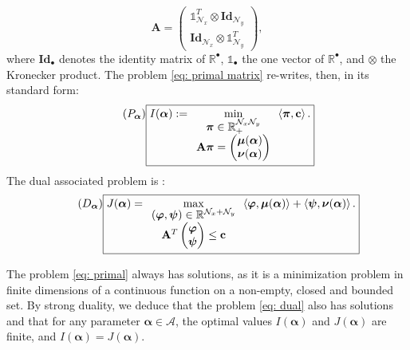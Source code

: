 \documentclass{article}
\def\RR{\mathbb{R}}
\def\cA{\mathcal{A}}
\def\cN{\mathcal{N}}
\def\aalpha{\boldsymbol{\alpha}}
\def\pphi{\boldsymbol{\varphi}}
\def\ppsi{\boldsymbol{\psi}}
\def\ppi{\boldsymbol{\pi}}
\def\mmu{\boldsymbol{\mu}}
\def\nnu{\boldsymbol{\nu}}
\def\cc{\mathbf{c}}
\def\AA{\mathbf{A}}
\def\11{\mathbb{1}}
\begin{document}
%
\begin{equation}\label{eq: A}
    \AA = \begin{pmatrix}
            \mathbb{1}^T_{\cN_x} \otimes \textbf{Id}_{\cN_y} \\ 
            \mathbf{Id}_{\cN_x} \otimes \11^T_{\cN_y} 
          \end{pmatrix}, 
\end{equation}
%
where $\mathbf{Id}_\bullet$ denotes the identity matrix of $\RR^\bullet$, $\mathbb{1}_\bullet$ the one vector of $\RR^\bullet$, and $\otimes$ the Kronecker product. The problem \eqref{eq: primal matrix} re-writes, then,  in its standard form:
%
\begin{equation}\label{eq: primal}\tag{$P_{\aalpha}$}
\boxed{I(\aalpha):= \mathop{\min}_{\begin{array}{c}
\ppi\in \RR_+^{\cN_x \cN_y}\\
\AA \ppi= \begin{pmatrix} \mmu(\aalpha) \\ \nnu(\aalpha)\end{pmatrix}
\end{array}
}
\left\langle \ppi, \cc \right\rangle .}
\end{equation}
%
The dual associated problem is : 
%
\begin{equation}\label{eq: dual}\tag{$D_{\aalpha}$}
\boxed{J(\aalpha) = \mathop{\max}_{ \begin{array}{c}
(\pphi,\ppsi) \in \RR^{\cN_x + \cN_y} \\
\AA^T \begin{pmatrix} \pphi \\ \ppsi \end{pmatrix} \leq \cc \\
\end{array}
} 
\left\langle \pphi, \mmu(\aalpha) \right\rangle + \left\langle \ppsi, \nnu(\aalpha) \right\rangle .}
\end{equation}

The problem \ref{eq: primal} always has solutions, as it is a minimization problem in finite dimensions of a continuous function on a non-empty, closed and bounded set. By strong duality, we deduce that the problem \ref{eq: dual} also has solutions and that for any parameter $\aalpha \in \cA$, the optimal values $I(\aalpha)$ and $J(\aalpha)$ are finite, and $I(\aalpha) = J(\aalpha)$.
%
\end{document}

